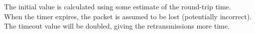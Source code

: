 The initial value is calculated using some estimate of the round-trip time. \\
When the timer expires, the packet is assumed to be lost (potentially incorrect).
The timeout value will be doubled, giving the retransmissions more time.